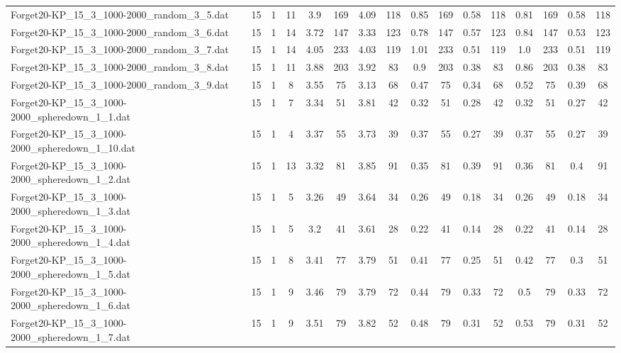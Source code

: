 \begin{sidewaystable}[!ht]
{\begin{tabular}{lccccccccccccccc}
Forget20-KP\_15\_3\_1000-2000\_random\_3\_5.dat & 15 & 1 & 11 & 3.9 & 169 & 4.09 & 118 & 0.85 & 169 & 0.58 & 118 & 0.81 & 169 & 0.58 & 118 \\
Forget20-KP\_15\_3\_1000-2000\_random\_3\_6.dat & 15 & 1 & 14 & 3.72 & 147 & 3.33 & 123 & 0.78 & 147 & 0.57 & 123 & 0.84 & 147 &  \textcolor{blue2}{0.53} & 123 \\
Forget20-KP\_15\_3\_1000-2000\_random\_3\_7.dat & 15 & 1 & 14 & 4.05 & 233 & 4.03 & 119 & 1.01 & 233 &  \textcolor{blue2}{0.51} & 119 & 1.0 & 233 &  \textcolor{blue2}{0.51} & 119 \\
Forget20-KP\_15\_3\_1000-2000\_random\_3\_8.dat & 15 & 1 & 11 & 3.88 & 203 & 3.92 & 83 & 0.9 & 203 &  \textcolor{blue2}{0.38} & 83 & 0.86 & 203 &  \textcolor{blue2}{0.38} & 83 \\
Forget20-KP\_15\_3\_1000-2000\_random\_3\_9.dat & 15 & 1 & 8 & 3.55 & 75 & 3.13 & 68 & 0.47 & 75 &  \textcolor{blue2}{0.34} & 68 & 0.52 & 75 & 0.39 & 68 \\
Forget20-KP\_15\_3\_1000-2000\_spheredown\_1\_1.dat & 15 & 1 & 7 & 3.34 & 51 & 3.81 & 42 & 0.32 & 51 & 0.28 & 42 & 0.32 & 51 &  \textcolor{blue2}{0.27} & 42 \\
Forget20-KP\_15\_3\_1000-2000\_spheredown\_1\_10.dat & 15 & 1 & 4 & 3.37 & 55 & 3.73 & 39 & 0.37 & 55 &  \textcolor{blue2}{0.27} & 39 & 0.37 & 55 &  \textcolor{blue2}{0.27} & 39 \\
Forget20-KP\_15\_3\_1000-2000\_spheredown\_1\_2.dat & 15 & 1 & 13 & 3.32 & 81 & 3.85 & 91 &  \textcolor{blue2}{0.35} & 81 & 0.39 & 91 & 0.36 & 81 & 0.4 & 91 \\
Forget20-KP\_15\_3\_1000-2000\_spheredown\_1\_3.dat & 15 & 1 & 5 & 3.26 & 49 & 3.64 & 34 & 0.26 & 49 &  \textcolor{blue2}{0.18} & 34 & 0.26 & 49 &  \textcolor{blue2}{0.18} & 34 \\
Forget20-KP\_15\_3\_1000-2000\_spheredown\_1\_4.dat & 15 & 1 & 5 & 3.2 & 41 & 3.61 & 28 & 0.22 & 41 &  \textcolor{blue2}{0.14} & 28 & 0.22 & 41 &  \textcolor{blue2}{0.14} & 28 \\
Forget20-KP\_15\_3\_1000-2000\_spheredown\_1\_5.dat & 15 & 1 & 8 & 3.41 & 77 & 3.79 & 51 & 0.41 & 77 &  \textcolor{blue2}{0.25} & 51 & 0.42 & 77 & 0.3 & 51 \\
Forget20-KP\_15\_3\_1000-2000\_spheredown\_1\_6.dat & 15 & 1 & 9 & 3.46 & 79 & 3.79 & 72 & 0.44 & 79 & 0.33 & 72 & 0.5 & 79 & 0.33 & 72 \\
Forget20-KP\_15\_3\_1000-2000\_spheredown\_1\_7.dat & 15 & 1 & 9 & 3.51 & 79 & 3.82 & 52 & 0.48 & 79 &  \textcolor{blue2}{0.31} & 52 & 0.53 & 79 &  \textcolor{blue2}{0.31} & 52 \\

\end{tabular}}
\end{sidewaystable}
